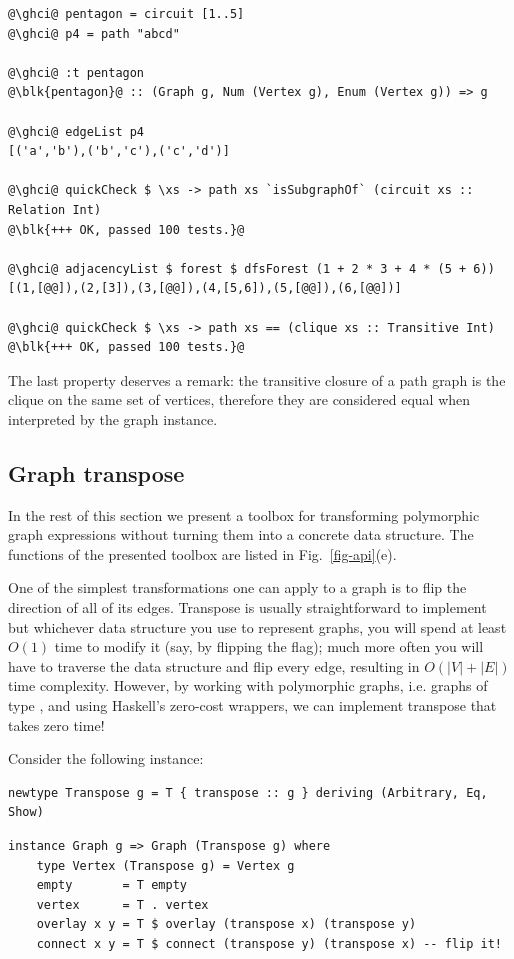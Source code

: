 \begin{verbatim}
@\ghci@ pentagon = circuit [1..5]
@\ghci@ p4 = path "abcd"

@\ghci@ :t pentagon
@\blk{pentagon}@ :: (Graph g, Num (Vertex g), Enum (Vertex g)) => g

@\ghci@ edgeList p4
[('a','b'),('b','c'),('c','d')]

@\ghci@ quickCheck $ \xs -> path xs `isSubgraphOf` (circuit xs :: Relation Int)
@\blk{+++ OK, passed 100 tests.}@

@\ghci@ adjacencyList $ forest $ dfsForest (1 + 2 * 3 + 4 * (5 + 6))
[(1,[@@]),(2,[3]),(3,[@@]),(4,[5,6]),(5,[@@]),(6,[@@])]

@\ghci@ quickCheck $ \xs -> path xs == (clique xs :: Transitive Int)
@\blk{+++ OK, passed 100 tests.}@
\end{verbatim}

The last property deserves a remark: the transitive closure of a path graph
is the clique on the same set of vertices, therefore they are considered equal
when interpreted by the  graph instance.

\subsection{Graph transpose}

In the rest of this section we present a toolbox for transforming polymorphic graph
expressions without turning them into a concrete data structure. The functions of the
presented toolbox are listed in Fig.~\ref{fig-api}(e).

One of the simplest transformations one can apply to a graph is to flip the
direction of all of its edges. Transpose is usually straightforward to implement but
whichever data structure you use to represent graphs, you will spend at least
$O(1)$ time to modify it (say, by flipping the  flag);
much more often you will have to traverse the data structure and flip every edge,
resulting in $O(|V|+|E|)$ time complexity. However, by working with polymorphic
graphs, i.e. graphs of type , and using Haskell's
zero-cost  wrappers, we can implement transpose that takes zero time!

Consider the following  instance:

\begin{verbatim}
newtype Transpose g = T { transpose :: g } deriving (Arbitrary, Eq, Show)
\end{verbatim}
\vspace{1mm}
\begin{verbatim}
instance Graph g => Graph (Transpose g) where
    type Vertex (Transpose g) = Vertex g
    empty       = T empty
    vertex      = T . vertex
    overlay x y = T $ overlay (transpose x) (transpose y)
    connect x y = T $ connect (transpose y) (transpose x) -- flip it!
\end{verbatim}

